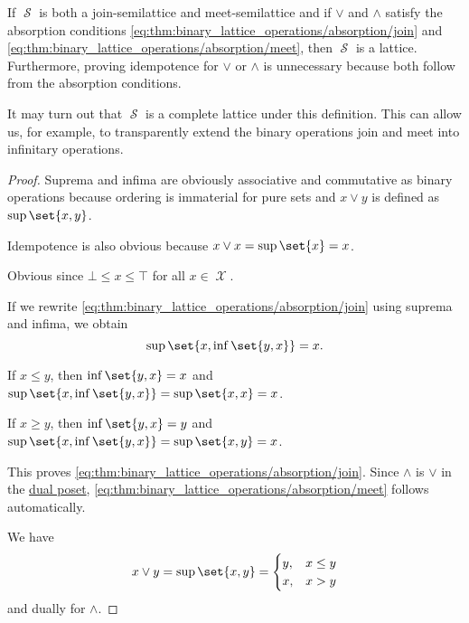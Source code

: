 \begin{proposition}
\begin{thmenum}
    If \( \mscrS \) is both a join-semilattice and meet-semilattice and if \( \vee \) and \( \wedge \) satisfy the absorption conditions \eqref{eq:thm:binary_lattice_operations/absorption/join} and \eqref{eq:thm:binary_lattice_operations/absorption/meet}, then \( \mscrS \) is a lattice. Furthermore, proving idempotence for \( \vee \) or \( \wedge \) is unnecessary because both follow from the absorption conditions.

    It may turn out that \( \mscrS \) is a complete lattice under this definition. This can allow us, for example, to transparently extend the binary operations join and meet into infinitary operations.
  \end{thmenum}
\end{proposition}
\begin{proof}
   Suprema and infima are obviously associative and commutative as binary operations because ordering is immaterial for pure sets and \( x \vee y \) is defined as \( \sup\set{ x, y } \).

  Idempotence is also obvious because \( x \vee x = \sup\set{ x } = x \).

   Obvious since \( \bot \leq x \leq \top \) for all \( x \in \mscrX \).

   If we rewrite \eqref{eq:thm:binary_lattice_operations/absorption/join} using suprema and infima, we obtain
  \begin{equation*}
    \sup\set{ x, \inf\set{ y, x } } = x.
  \end{equation*}

  If \( x \leq y \), then \( \inf\set{ y, x } = x \) and \( \sup\set{ x, \inf\set{ y, x } } = \sup\set{ x, x } = x \).

  If \( x \geq y \), then \( \inf\set{ y, x } = y \) and \( \sup\set{ x, \inf\set{ y, x } } = \sup\set{ x, y } = x \).

  This proves \eqref{eq:thm:binary_lattice_operations/absorption/join}. Since \( \wedge \) is \( \vee \) in the \hyperref[def:preordered_set/duality]{dual poset}, \eqref{eq:thm:binary_lattice_operations/absorption/meet} follows automatically.

   We have
  \begin{equation*}
    x \vee y
    =
    \sup\set{ x, y }
    =
    \begin{cases}
      y, &x \leq y \\
      x, &x > y
    \end{cases}
  \end{equation*}
  and dually for \( \wedge \).


\end{proof}

